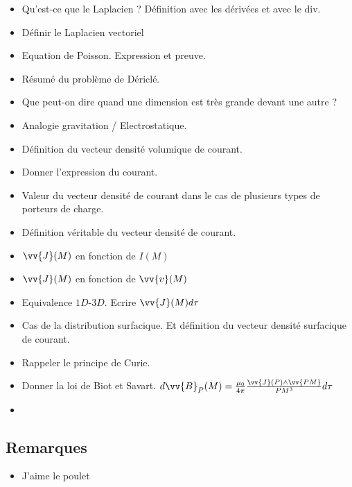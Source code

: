 \documentclass[a4paper, 11pt, hidelinks]{article}
\begin{document}
\begin{itemize}
    \item Qu'est-ce que le Laplacien ? Définition avec les dérivées et avec le div. \cite{Chapitre10}
    \item Définir le Laplacien vectoriel \cite{Chapitre10}
    \item Equation de Poisson. Expression et preuve. \cite{Chapitre10}
    \item Résumé du problème de Dériclé. \cite{Chapitre10}
    \item Que peut-on dire quand une dimension est très grande devant une autre ? \cite{Chapitre10}
    \item Analogie gravitation / Electrostatique. \cite{Chapitre10}
    \item Définition du vecteur densité volumique de courant. \cite{Chapitre11}
    \item Donner l'expression du courant. \cite{Chapitre11}
    \item Valeur du vecteur densité de courant dans le cas de plusieurs types de porteurs de charge. \cite{Chapitre11}
    \item Définition véritable du vecteur densité de courant. \cite{Chapitre11}
    \item $\vv{J}(M)$ en fonction de $I(M)$ \cite{Chapitre11}
    \item $\vv{J}(M)$ en fonction de $\vv{v}(M)$ \cite{Chapitre11}
    \item Equivalence $1D$-$3D$. Ecrire $\vv{J}(M) d \tau$ \cite{Chapitre11}
    \item Cas de la distribution surfacique. Et définition du vecteur densité surfacique de courant. \cite{Chapitre11}
    \item Rappeler le principe de Curie. \cite{Chapitre11}
    \item Donner la loi de Biot et Savart. $d\vv{B}_P(M)=\frac{\mu_0}{4 \pi}\frac{\vv{J}(P)\land \vv{PM}}{PM^3}d\tau$ \cite{Chapitre11}
    \item 
\end{itemize}




\subsection{Remarques}


\begin{itemize}
    \item J'aime le poulet
\end{itemize}










\end{document}
